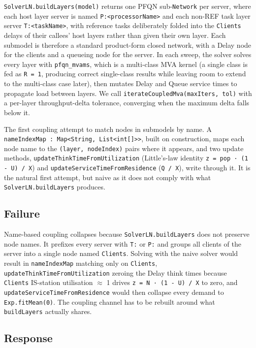\texttt{SolverLN.buildLayers(model)} returns one PFQN sub-\texttt{Network} per server, where each host layer server is named \texttt{P:<processorName>} and each non-REF task layer server \texttt{T:<taskName>}, with reference tasks deliberately folded into the \texttt{Clients} delays of their callees' host layers rather than given their own layer. Each submodel is therefore a standard product-form closed network, with a Delay node for the clients and a queueing node for the server. In each sweep, the solver solves every layer with \texttt{pfqn\_mvams}, which is a multi-class MVA kernel (a single class is fed as \texttt{R = 1}, producing correct single-class results while leaving room to extend to the multi-class case later), then mutates Delay and Queue service times to propagate load between layers. We call \texttt{iterateCoupledMva(maxIters, tol)} with a per-layer throughput-delta tolerance, converging when the maximum delta falls below it.

The first coupling attempt to match nodes in submodels by name. A \texttt{nameIndexMap : Map<String, List<int[]>>}, built on construction, maps each node name to the \texttt{(layer, nodeIndex)} pairs where it appears, and two update methods, \texttt{updateThinkTimeFromUtilization} (Little's-law identity \texttt{z = pop · (1 - U) / X}) and \texttt{updateServiceTimeFromResidence} (\texttt{Q / X}), write through it. It is the natural first attempt, but naive as it does not comply with what \texttt{SolverLN.buildLayers} produces.

\subsection{Failure}

Name-based coupling collapses because \texttt{SolverLN.buildLayers} does not preserve node names. It prefixes every server with \texttt{T:} or \texttt{P:} and groups all clients of the server into a single node named \texttt{Clients}. Solving with the naive solver would result in \texttt{nameIndexMap} matching only on \texttt{Clients}, \texttt{updateThinkTimeFromUtilization} zeroing the Delay think times because \texttt{Clients} IS-station utilisation $\approx$ 1 drives \texttt{z = N · (1 - U) / X} to zero, and \texttt{updateServiceTimeFromResidence} would then collapse every demand to \texttt{Exp.fitMean(0)}. The coupling channel has to be rebuilt around what \texttt{buildLayers} actually shares.

\subsection{Response}

